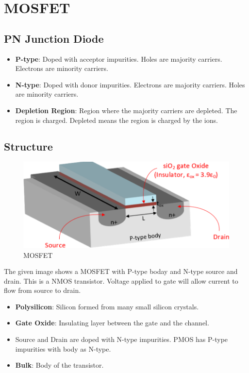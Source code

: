 \section{MOSFET}

\subsection{PN Junction Diode}

\begin{itemize}
    \item \textbf{P-type}: Doped with acceptor impurities. Holes are majority carriers. Electrons are minority carriers.
    \item \textbf{N-type}: Doped with donor impurities. Electrons are majority carriers. Holes are minority carriers.
    \item \textbf{Depletion Region}: Region where the majority carriers are depleted. The region is charged. Depleted means the region is charged by the ions.
\end{itemize}

\subsection{Structure}

\begin{figure}
    \centering
    \includegraphics[scale=0.5]{images/MOSFET.png}
    \caption{MOSFET}
\end{figure}

The given image shows a MOSFET with P-type boday and N-type source and drain.
This is a NMOS transistor. Voltage applied to gate will allow current to flow
from source to drain.

\begin{itemize}
    \item \textbf{Polysilicon}: Silicon formed from many small silicon crystals.
    \item \textbf{Gate Oxide}: Insulating layer between the gate and the channel.
    \item Source and Drain are doped with N-type impurities. PMOS has P-type impurities
    with body as N-type.
    \item \textbf{Bulk}: Body of the transistor.
\end{itemize}

